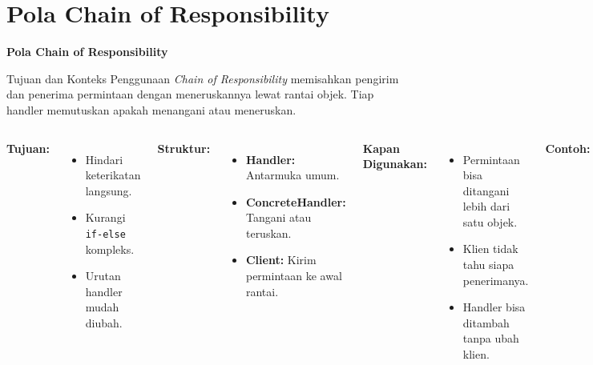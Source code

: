 \documentclass[aspectratio=169, table]{beamer}
\begin{document}
\section{Pola Chain of Responsibility}
\begin{frame}{\hfill}
\centering
\textbf{\Huge{Pola Chain of Responsibility}}
\end{frame}


\begin{frame}{Tujuan dan Konteks Penggunaan}
	\vspace{10pt}
	\textit{Chain of Responsibility} memisahkan pengirim dan penerima permintaan dengan meneruskannya lewat rantai objek. Tiap handler memutuskan apakah menangani atau meneruskan.
	\begin{columns}[T]
		\textbf{Tujuan:}
		\begin{itemize}
			\item Hindari keterikatan langsung.
			\item Kurangi \texttt{if-else} kompleks.
			\item Urutan handler mudah diubah.
		\end{itemize}
		
		\textbf{Struktur:}
		\begin{itemize}
			\item \textbf{Handler:} Antarmuka umum.
			\item \textbf{ConcreteHandler:} Tangani atau teruskan.
			\item \textbf{Client:} Kirim permintaan ke awal rantai.
		\end{itemize}
		
		\textbf{Kapan Digunakan:}
		\begin{itemize}
			\item Permintaan bisa ditangani lebih dari satu objek.
			\item Klien tidak tahu siapa penerimanya.
			\item Handler bisa ditambah tanpa ubah klien.
		\end{itemize}
		
		\textbf{Contoh:}
		\begin{itemize}
			\item Validasi bertingkat, Logging bertahap, Approval multi-level, Middleware web.
		\end{itemize}
	\end{columns}
\end{frame}
\end{document}
